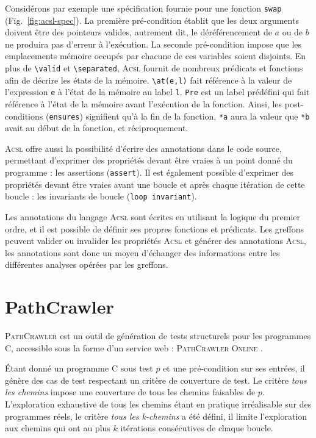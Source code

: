 \documentclass[french]{spimufcphdthesis}
\begin{document}
Considérons par exemple une spécification fournie pour une fonction
\lstinline{swap}
(Fig.~\ref{fig:acsl-spec}). La première pré-condition établit que les deux
arguments doivent être des pointeurs valides, autrement dit, le déréférencement
de $a$ ou de $b$ ne produira pas d'erreur à l'exécution. La seconde
pré-condition impose que les emplacements mémoire occupés par chacune de ces
variables soient disjoints. En plus de \lstinline{\valid} et
\lstinline{\separated}, \textsc{Acsl} fournit de nombreux prédicats et
fonctions afin de décrire les états de la mémoire. \lstinline{\at(e,l)}
fait référence à la valeur de l'expression \lstinline{e} à l'état de la mémoire
au label \lstinline{l}. \lstinline{Pre} est un label prédéfini qui fait
référence à l'état de la mémoire avant l'exécution de la fonction. Ainsi, les
post-conditions (\lstinline{ensures}) signifient qu'à la fin de la fonction,
\lstinline{*a} aura la valeur que \lstinline{*b} avait au
début de la fonction, et réciproquement.


\textsc{Acsl} offre aussi la possibilité d'écrire des annotations dans le code
source, permettant d'exprimer des propriétés devant être vraies à un point donné
du programme : les assertions (\lstinline{assert}).
Il est également possible d'exprimer des propriétés devant être vraies avant une
boucle et après chaque itération de cette boucle : les invariants de boucle
(\lstinline{loop invariant}).


Les annotations du langage \textsc{Acsl} sont écrites en utilisant la logique
du premier ordre, et il est possible de définir ses propres fonctions et
prédicats.
Les greffons peuvent valider ou invalider les propriétés \textsc{Acsl} et
générer des annotations \textsc{Acsl}, les annotations sont donc un moyen
d'échanger des informations entre les différentes analyses opérées par les
greffons.


\section{PathCrawler}

\textsc{PathCrawler} \cite{PathCrawler} est un outil de génération de tests
structurels pour les programmes C, accessible sous la forme d'un service web :
\textsc{PathCrawler Online} \cite{PathCrawlerOnline}.

Étant donné un programme C sous test $p$ et une pré-condition sur ses entrées,
il génère des cas de test respectant un critère de couverture de test. Le
critère \emph{tous les chemins} impose une couverture de tous les chemins
faisables de $p$. L'exploration exhaustive de tous les chemins étant en pratique
irréalisable sur des programmes réels, le critère \emph{tous les k-chemins} a
été défini, il limite l'exploration aux chemins qui ont au plus $k$ itérations
consécutives de chaque boucle.
\end{document}
